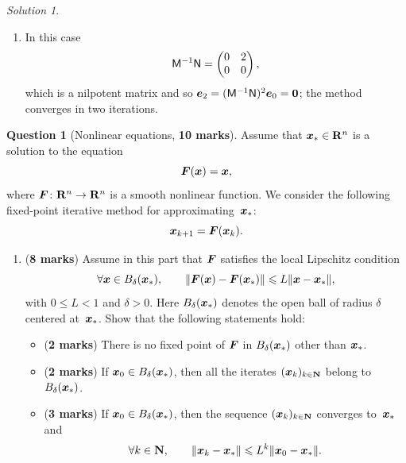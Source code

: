 \documentclass[11pt]{article}
\theoremstyle{definition}
\newtheorem{question}{Question}
\theoremstyle{remark}
\newtheorem*{solution}{Solution}
\begin{document}
\begin{solution}
\begin{enumerate}
        \item
            In this case
            \[
                \mathsf M^{-1} \mathsf N =
                \begin{pmatrix}
                    0 & 2 \\ 0 & 0
                \end{pmatrix},
            \]
            which is a nilpotent matrix and so $\mathbf{\boldsymbol{e}}_2 = (\mathsf M^{-1} \mathsf N)^2 \mathbf{\boldsymbol{e}}_0 = \mathbf{\boldsymbol{0}}$;
            the method converges in two iterations.
    \end{enumerate}
\end{solution}

\newpage
\begin{question}
    [Nonlinear equations, \textbf{10 marks}]
    Assume that $\mathbf{\boldsymbol{x}}_* \in \mathbf R^n$ is a solution to the equation
    \[
        \mathbf{\boldsymbol{F}}(\mathbf{\boldsymbol{x}}) = \mathbf{\boldsymbol{x}},
    \]
    where $\mathbf{\boldsymbol{F}}\colon \mathbf R^n \to \mathbf R^n$ is a smooth nonlinear function.
    We consider the following fixed-point iterative method for approximating~$\mathbf{\boldsymbol{x}}_*$:
    \begin{equation}
        \label{eq:fixed_point}
        \mathbf{\boldsymbol{x}}_{k+1} = \mathbf{\boldsymbol{F}}(\mathbf{\boldsymbol{x}}_k).
    \end{equation}
    \begin{enumerate}
        \item
            (\textbf{8 marks})
            Assume in this part that $\mathbf{\boldsymbol{F}}$ satisfies the local Lipschitz condition
            \begin{equation}
                \label{eq:local_lipschitz}
                \forall \vect x \in B_{\delta}(\vect x_*), \qquad
                \norm[big]{\vect F(\vect x) - \vect F(\vect x_*)} \leq L \norm{\vect x - \vect x_*},
            \end{equation}
            with $0 \leq L < 1$ and $\delta > 0$.
            Here $B_{\delta}(\mathbf{\boldsymbol{x}}_*)$ denotes the open ball of radius $\delta$ centered at~$\mathbf{\boldsymbol{x}}_*$.
            Show that the following statements hold:
            \begin{itemize}
                \item (\textbf{2 marks}) There is no fixed point of $\mathbf{\boldsymbol{F}}$ in $B_{\delta}(\mathbf{\boldsymbol{x}}_*)$ other than $\mathbf{\boldsymbol{x}}_*$.
                \item (\textbf{2 marks}) If $\mathbf{\boldsymbol{x}}_0 \in B_{\delta}(\mathbf{\boldsymbol{x}}_*)$, then all the iterates $(\mathbf{\boldsymbol{x}}_k)_{k \in \mathbf N}$ belong to $B_{\delta}(\mathbf{\boldsymbol{x}}_*)$.
                \item (\textbf{3 marks}) If $\mathbf{\boldsymbol{x}}_0 \in B_{\delta}(\mathbf{\boldsymbol{x}}_*)$, then the sequence $(\mathbf{\boldsymbol{x}}_k)_{k \in \mathbf N}$ converges to~$\mathbf{\boldsymbol{x}}_*$ and
                    \[
                        \forall k \in \mathbf N, \qquad
                        \lVert\mathbf{\boldsymbol{x}}_k - \mathbf{\boldsymbol{x}}_*\rVert \leqslant L^k \lVert\mathbf{\boldsymbol{x}}_0 - \mathbf{\boldsymbol{x}}_*\rVert.
                    \]
            \end{itemize}


\end{enumerate}
\end{question}
\end{document}
